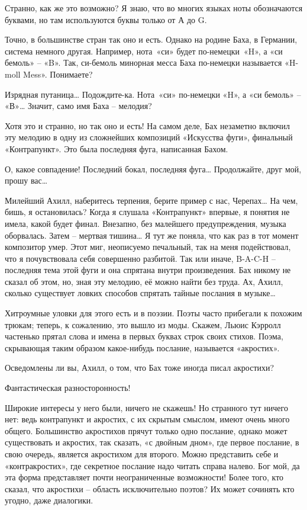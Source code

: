 \documentclass[../main.tex]{subfiles}
\begin{document}
\begin{dialogue}
 Странно, как же это возможно? Я знаю, что во многих языках ноты обозначаются буквами, но там используются буквы только от А до G.

 Точно, в большинстве стран так оно и есть. Однако на родине Баха, в Германии, система немного другая. Например, нота~«си» будет по-немецки~«H», а «си бемоль» \--- «B». Так, си-бемоль минорная месса Баха по-немецки называется «H-moll Mess». Понимаете?

 Изрядная путаница\ldots{} Подождите-ка. Нота~«си» по-немецки «H», а «си бемоль» \--- «В»\ldots{} Значит, само имя Баха \--- мелодия?

 Хотя это и странно, но так оно и есть! На самом деле, Бах незаметно включил эту мелодию в одну из сложнейших композиций «Искусства фуги», финальный «Контрапункт». Это была последняя фуга, написанная Бахом.

 О, какое совпадение! Последний бокал, последняя фуга\ldots{} Продолжайте, друг мой, прошу вас\ldots{}

 Милейший Ахилл, наберитесь терпения, берите пример с нас, Черепах\ldots{} На чем, бишь, я остановилась? Когда я слушала «Контрапункт» впервые, я понятия не имела, какой будет финал. Внезапно, без малейшего предупреждения, музыка оборвалась. Затем \--- мертвая тишина\ldots{} Я тут же поняла, что как раз в тот момент композитор умер. Этот миг, неописуемо печальный, так на меня подействовал, что я почувствовала себя совершенно разбитой. Так или иначе, \mbox{B-A-C-H} \--- последняя тема этой фуги и она спрятана внутри произведения. Бах никому не сказал об этом, но, зная эту мелодию, её можно найти без труда. Ах, Ахилл, сколько существует ловких способов спрятать тайные послания в музыке\ldots{}

 {\Large Х}итроумные уловки для этого есть и в поэзии. Поэты часто прибегали к похожим трюкам; теперь, к сожалению, это вышло из моды. Скажем, Льюис Кэрролл частенько прятал слова и имена в первых буквах строк своих стихов. Поэма, скрывающая таким образом какое-нибудь послание, называется «акростих».

 Осведомлены ли вы, Ахилл, о том, что Бах тоже иногда писал акростихи?

 Фантастическая разносторонность!

 Широкие интересы у него были, ничего не скажешь! Но странного тут ничего нет: ведь контрапункт и акростих, с их скрытым смыслом, имеют очень много общего. Большинство акростихов прячут только одно послание, однако может существовать и акростих, так сказать, «с двойным дном», где первое послание, в свою очередь, является акростихом для второго. Можно представить себе и «контракростих», где секретное послание надо читать справа налево. Бог мой, да эта форма представляет почти неограниченные возможности! Более того, кто сказал, что акростихи \--- область исключительно поэтов? Их может сочинять кто угодно, даже диалогики.


\end{dialogue}
\end{document}
